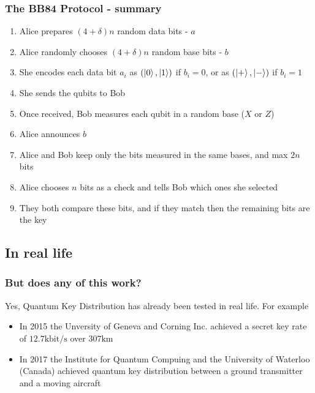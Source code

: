 \documentclass{beamer}
\begin{document}
  \begin{frame}
    \frametitle{The BB84 Protocol - summary}
    \begin{enumerate}
      \item Alice prepares $(4 + \delta)n$ random data bits - $a$
      \item Alice randomly chooses $(4 + \delta)n$ random base bits - $b$
      \item She encodes each data bit $a_i$ as $(\ket0, \ket1)$ if $b_i = 0$, or as $(\ket+, \ket-)$ if $b_i = 1$
      \item She sends the qubits to Bob
      \item Once received, Bob measures each qubit in a random base ($X$ or $Z$)
      \item Alice announces $b$
      \item Alice and Bob keep only the bits measured in the same bases, and max $2n$ bits
      \item Alice chooses $n$ bits as a check and tells Bob which ones she selected
      \item They both compare these bits, and if they match then the remaining bits are the key
    \end{enumerate}  
  \end{frame}

  \subsection{In real life}
  \begin{frame}
    \frametitle{But does any of this work?}
    Yes, Quantum Key Distribution has already been tested in real life.
    For example
    \begin{itemize}
      \item In 2015 the Unversity of Geneva and Corning Inc. achieved a secret key
            rate of $12.7 \mathrm{kbit/s}$ over $307 \mathrm{km}$ \cite{qkd}
      \item In 2017 the Institute for Quantum Compuing and the University of Waterloo (Canada) achieved
            quantum key distribution between a ground transmitter and a moving aircraft \cite{airborne}
    \end{itemize}
  \end{frame}
\end{document}
